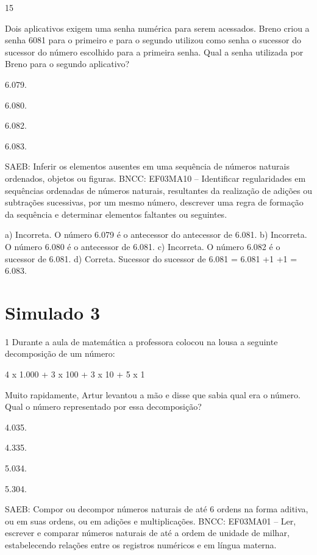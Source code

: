 \begin{multicols}{2}
\begin{enumerate}
{\num{15}

Dois aplicativos exigem uma senha numérica para serem acessados. Breno criou a senha 6081 para o primeiro e para o segundo utilizou como senha o sucessor do sucessor do número escolhido para a primeira senha. Qual a senha utilizada por Breno para o segundo aplicativo?

\begin{escolha}
\item
  6.079.
\item
  6.080.
\item
  6.082.
\item
  6.083.
\end{escolha}

SAEB: Inferir os elementos ausentes em uma sequência de números naturais ordenados, objetos ou figuras.
BNCC: EF03MA10 -- Identificar regularidades em sequências ordenadas de números naturais,
resultantes da realização de adições ou subtrações sucessivas, por um mesmo número,
descrever uma regra de formação da sequência e determinar elementos faltantes ou seguintes.

a) Incorreta. O número 6.079 é o antecessor do antecessor de 6.081.
b) Incorreta. O número 6.080 é o antecessor de 6.081.
c) Incorreta. O número 6.082 é o sucessor de 6.081.
d) Correta. Sucessor do sucessor de 6.081 = 6.081 +1 +1 = 6.083.

\chapter{Simulado 3}

\num{1} Durante a aula de matemática a professora colocou na lousa a seguinte decomposição de um número:

4 x 1.000 + 3 x 100 + 3 x 10 + 5 x 1

Muito rapidamente, Artur levantou a mão e disse que sabia qual era o número. Qual o número representado por essa decomposição?

\begin{escolha}
\item
  4.035.
\item
  4.335.
\item
  5.034.
\item
  5.304.
\end{escolha}

SAEB: Compor ou decompor números naturais de até 6 ordens na forma aditiva, ou em suas ordens, ou em adições e multiplicações.
BNCC: EF03MA01 -- Ler, escrever e comparar números naturais de até a ordem de unidade de milhar, estabelecendo relações entre os registros numéricos e em língua materna.

}
\end{enumerate}
\end{multicols}
